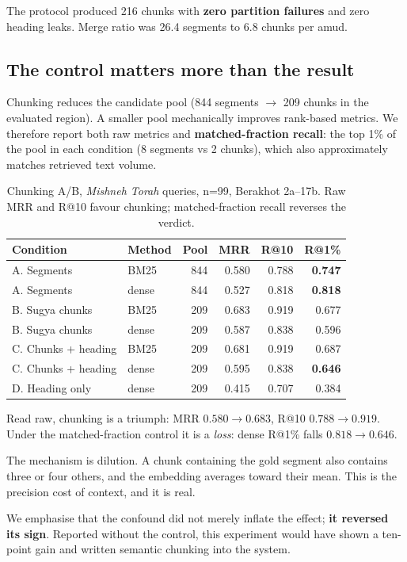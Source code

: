 \documentclass[11pt,a4paper]{article}
\begin{document}
The protocol produced 216 chunks with \textbf{zero partition failures} and zero
heading leaks. Merge ratio was 26.4 segments to 6.8 chunks per amud.

\subsection{The control matters more than the result}

Chunking reduces the candidate pool (844 segments $\to$ 209 chunks in the
evaluated region). A smaller pool mechanically improves rank-based metrics. We
therefore report both raw metrics and \textbf{matched-fraction recall}: the top
1\% of the pool in each condition (8 segments vs 2 chunks), which also
approximately matches retrieved text volume.

\begin{table}[h]
\centering
\begin{tabular}{llrrrr}
\toprule
Condition & Method & Pool & MRR & R@10 & \textbf{R@1\%} \\
\midrule
A. Segments & BM25 & 844 & 0.580 & 0.788 & \textbf{0.747} \\
A. Segments & dense & 844 & 0.527 & 0.818 & \textbf{0.818} \\
B. Sugya chunks & BM25 & 209 & 0.683 & 0.919 & 0.677 \\
B. Sugya chunks & dense & 209 & 0.587 & 0.838 & 0.596 \\
C. Chunks + heading & BM25 & 209 & 0.681 & 0.919 & 0.687 \\
C. Chunks + heading & dense & 209 & 0.595 & 0.838 & \textbf{0.646} \\
D. Heading only & dense & 209 & 0.415 & 0.707 & 0.384 \\
\bottomrule
\end{tabular}
\caption{Chunking A/B, \emph{Mishneh Torah} queries, n=99, Berakhot 2a--17b.
Raw MRR and R@10 favour chunking; matched-fraction recall reverses the verdict.}
\label{tab:ab}
\end{table}

Read raw, chunking is a triumph: MRR $0.580 \to 0.683$, R@10 $0.788 \to 0.919$.
Under the matched-fraction control it is a \emph{loss}: dense R@1\% falls
$0.818 \to 0.646$.

The mechanism is dilution. A chunk containing the gold segment also contains
three or four others, and the embedding averages toward their mean. This is the
precision cost of context, and it is real.

We emphasise that the confound did not merely inflate the effect; \textbf{it
reversed its sign}. Reported without the control, this experiment would have
shown a ten-point gain and written semantic chunking into the system.
\end{document}

